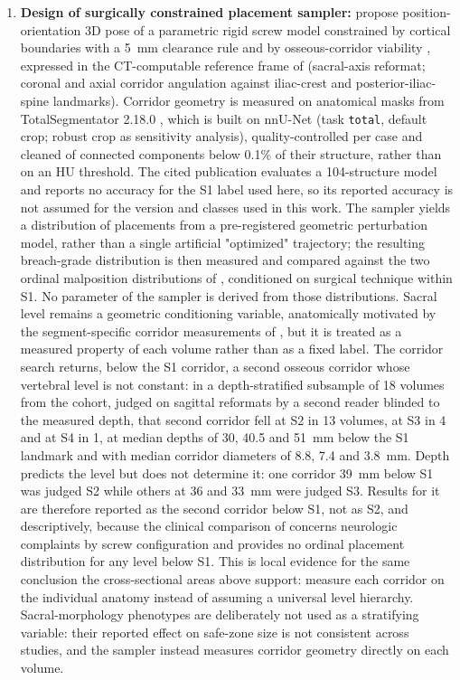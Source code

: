 \documentclass[9pt]{extarticle}
\begin{document}
\begin{enumerate}
  \item \textbf{Design of surgically constrained placement sampler:} propose position-orientation 3D pose of a parametric rigid screw model constrained by cortical boundaries with a 5~mm clearance rule and by osseous-corridor viability \citep{mclaren2021corridor}, expressed in the CT-computable reference frame of \citet{kaiser2014dysmorphism} (sacral-axis reformat; coronal and axial corridor angulation against iliac-crest and posterior-iliac-spine landmarks). Corridor geometry is measured on anatomical masks from TotalSegmentator 2.18.0 \citep{wasserthal2023}, which is built on nnU-Net \citep{isensee2021} (task \texttt{total}, default crop; robust crop as sensitivity analysis), quality-controlled per case and cleaned of connected components below 0.1\% of their structure, rather than on an HU threshold. The cited publication evaluates a 104-structure model and reports no accuracy for the S1 label used here, so its reported accuracy is not assumed for the version and classes used in this work. The sampler yields a distribution of placements from a pre-registered geometric perturbation model, rather than a single artificial "optimized" trajectory; the resulting breach-grade distribution is then measured and compared against the two ordinal malposition distributions of \citet{zwingmann2009navigated}, conditioned on surgical technique within S1. No parameter of the sampler is derived from those distributions. Sacral level remains a geometric conditioning variable, anatomically motivated by the segment-specific corridor measurements of \citet{gardner2010safezones}, but it is treated as a measured property of each volume rather than as a fixed label. The corridor search returns, below the S1 corridor, a second osseous corridor whose vertebral level is not constant: in a depth-stratified subsample of 18 volumes from the cohort, judged on sagittal reformats by a second reader blinded to the measured depth, that second corridor fell at S2 in 13 volumes, at S3 in 4 and at S4 in 1, at median depths of 30, 40.5 and 51~mm below the S1 landmark and with median corridor diameters of 8.8, 7.4 and 3.8~mm. Depth predicts the level but does not determine it: one corridor 39~mm below S1 was judged S2 while others at 36 and 33~mm were judged S3. Results for it are therefore reported as the second corridor below S1, not as S2, and descriptively, because the clinical comparison of \citet{vandenbosch2002} concerns neurologic complaints by screw configuration and provides no ordinal placement distribution for any level below S1. This is local evidence for the same conclusion the cross-sectional areas above support: measure each corridor on the individual anatomy instead of assuming a universal level hierarchy. Sacral-morphology phenotypes are deliberately not used as a stratifying variable: their reported effect on safe-zone size is not consistent across studies, and the sampler instead measures corridor geometry directly on each volume.

\end{enumerate}
\end{document}
